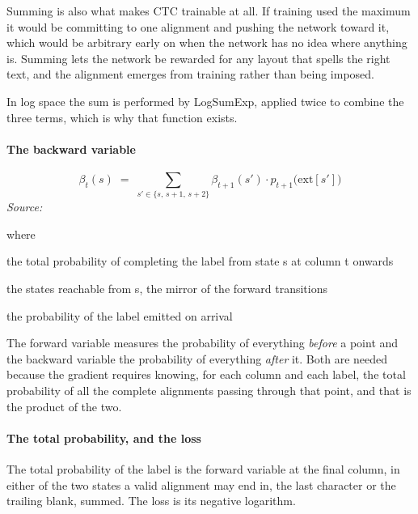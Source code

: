 Summing is also what makes CTC trainable at all. If training used the maximum it would be committing to one alignment and pushing the network toward it, which would be arbitrary early on when the network has no idea where anything is. Summing lets the network be rewarded for any layout that spells the right text, and the alignment emerges from training rather than being imposed.

In log space the sum is performed by LogSumExp, applied twice to combine the three terms, which is why that function exists.


\paragraph{The backward variable}

\begin{equation}
\beta_t(s) \;=\; \sum_{s' \in \{s,\,s+1,\,s+2\}} \beta_{t+1}(s') \cdot p_{t+1}\big(\mathrm{ext}[s']\big)
\end{equation}
\noindent\emph{Source: }\cite{graves2006}


\noindent where
\begin{description}[leftmargin=2.4em,style=nextline,font=\normalfont\ttfamily]\setlength\itemsep{1pt}
  \item[{$\beta_t(s)$}] \normalfont the total probability of completing the label from state s at column t onwards
  \item[{$s'$}] \normalfont the states reachable from s, the mirror of the forward transitions
  \item[{$p_{t+1}(\cdot)$}] \normalfont the probability of the label emitted on arrival
\end{description}
The forward variable measures the probability of everything \emph{before} a point and the backward variable the probability of everything \emph{after} it. Both are needed because the gradient requires knowing, for each column and each label, the total probability of all the complete alignments passing through that point, and that is the product of the two.


\paragraph{The total probability, and the loss}
The total probability of the label is the forward variable at the final column, in either of the two states a valid alignment may end in, the last character or the trailing blank, summed. The loss is its negative logarithm.


